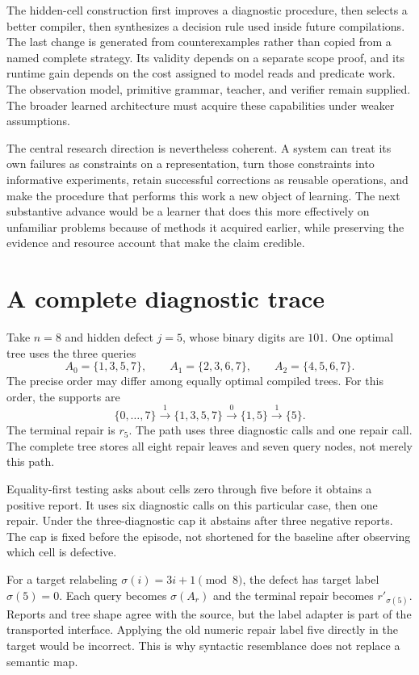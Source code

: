 \documentclass[11pt,letterpaper]{article}
\theoremstyle{plain}
\theoremstyle{definition}
\begin{document}
The hidden-cell construction first improves a diagnostic procedure, then selects a better compiler, then synthesizes a decision rule used inside future compilations. The last change is generated from counterexamples rather than copied from a named complete strategy. Its validity depends on a separate scope proof, and its runtime gain depends on the cost assigned to model reads and predicate work. The observation model, primitive grammar, teacher, and verifier remain supplied. The broader learned architecture must acquire these capabilities under weaker assumptions.

The central research direction is nevertheless coherent. A system can treat its own failures as constraints on a representation, turn those constraints into informative experiments, retain successful corrections as reusable operations, and make the procedure that performs this work a new object of learning. The next substantive advance would be a learner that does this more effectively on unfamiliar problems because of methods it acquired earlier, while preserving the evidence and resource account that make the claim credible.


\clearpage\appendix
\section{A complete diagnostic trace}\label{app:trace}
Take $n=8$ and hidden defect $j=5$, whose binary digits are $101$. One optimal tree uses the three queries
\[
A_0=\{1,3,5,7\},\qquad A_1=\{2,3,6,7\},\qquad A_2=\{4,5,6,7\}.
\]
The precise order may differ among equally optimal compiled trees. For this order, the supports are
\[
\{0,\ldots,7\}\xrightarrow{1}\{1,3,5,7\}
\xrightarrow{0}\{1,5\}\xrightarrow{1}\{5\}.
\]
The terminal repair is $r_5$. The path uses three diagnostic calls and one repair call. The complete tree stores all eight repair leaves and seven query nodes, not merely this path.

Equality-first testing asks about cells zero through five before it obtains a positive report. It uses six diagnostic calls on this particular case, then one repair. Under the three-diagnostic cap it abstains after three negative reports. The cap is fixed before the episode, not shortened for the baseline after observing which cell is defective.

For a target relabeling $\sigma(i)=3i+1\pmod8$, the defect has target label $\sigma(5)=0$. Each query becomes $\sigma(A_r)$ and the terminal repair becomes $r'_{\sigma(5)}$. Reports and tree shape agree with the source, but the label adapter is part of the transported interface. Applying the old numeric repair label five directly in the target would be incorrect. This is why syntactic resemblance does not replace a semantic map.
\end{document}
